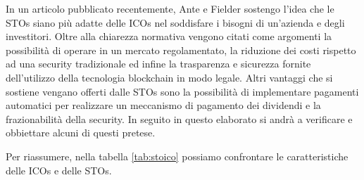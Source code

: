 In un articolo pubblicato recentemente, Ante e Fielder\cite{K35} sostengo l'idea che le STOs siano più adatte delle ICOs nel soddisfare i bisogni di un'azienda e degli investitori. Oltre alla chiarezza normativa vengono citati come argomenti la possibilità di operare in un mercato regolamentato, la riduzione dei costi rispetto ad una security tradizionale ed infine la trasparenza e sicurezza fornite dell'utilizzo della tecnologia blockchain in modo legale.\cite{K30} Altri vantaggi che si sostiene vengano offerti dalle STOs sono la possibilità di implementare pagamenti automatici per realizzare un meccanismo di pagamento dei dividendi e la  frazionabilità della security\cite{K36}. In seguito in questo elaborato si andrà a verificare e obbiettare alcuni di questi pretese.  

Per riassumere, nella tabella \ref{tab:stoico} possiamo confrontare le caratteristiche delle ICOs e delle STOs.  
